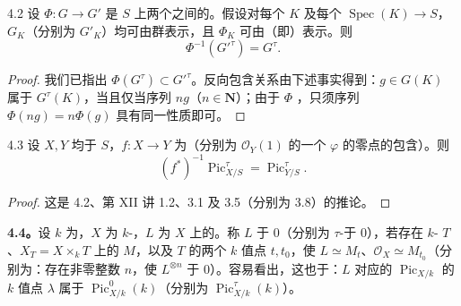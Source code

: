 \begin{SGAresult}{}{4.2}
设 $\Phi:G\to G'$ 是 $S$ 上两个之间的。假设对每个 $K$ 及每个 $\operatorname{Spec}(K)\to S$，$G_K$（分别为 $G'_K$）均可由群表示，且 $\Phi_K$ 可由（即）表示。则
\[\Phi^{-1}(G'^\tau)=G^\tau.\]
\end{SGAresult}
\begin{proof}
我们已指出 $\Phi(G^\tau)\subset G'^\tau$。反向包含关系由下述事实得到：$g\in G(K)$ 属于 $G^\tau(K)$，当且仅当序列 $ng$（$n\in\mathbf N$）；由于 $\Phi$ ，只须序列 $\Phi(ng)=n\Phi(g)$ 具有同一性质即可。
\end{proof}
\begin{SGAresult}{}{4.3}
设 $X,Y$ 均于 $S$，$f:X\to Y$ 为（分别为 $\mathscr O_Y(1)$ 的一个 $\varphi$ 的零点的包含）。则
\[(f^*)^{-1}\operatorname{Pic}^\tau_{X/S}=\operatorname{Pic}^\tau_{Y/S}.\]
\end{SGAresult}
\begin{proof}
这是 4.2、第 XII 讲 1.2、3.1 及 3.5（分别为 3.8）的推论。
\end{proof}
\textbf{4.4。}设 $k$ 为，$X$ 为 $k$-，$L$ 为 $X$ 上的。称 $L$ 于 $0$（分别为 $\tau$-于 $0$），若存在 $k$- $T$、$X_T=X\times_kT$ 上的 $M$，以及 $T$ 的两个 $k$ 值点 $t,t_0$，使 $L\simeq M_t$、$\mathscr O_X\simeq M_{t_0}$（分别为：存在非零整数 $n$，使 $L^{\otimes n}$ 于 $0$）。容易看出，这也于：$L$ 对应的 $\operatorname{Pic}_{X/k}$ 的 $k$ 值点 $\lambda$ 属于 $\operatorname{Pic}^0_{X/k}(k)$（分别为 $\operatorname{Pic}^\tau_{X/k}(k)$）。

